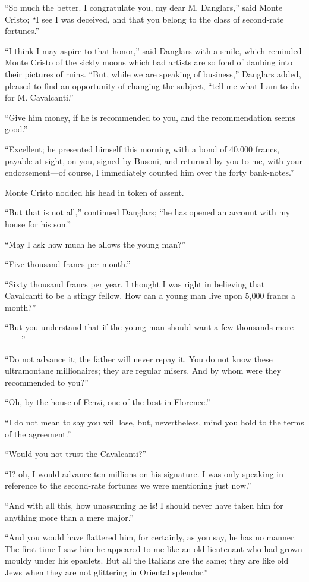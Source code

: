 “So much the better. I congratulate you, my dear M. Danglars,” said
Monte Cristo; “I see I was deceived, and that you belong to the class
of second-rate fortunes.”

“I think I may aspire to that honor,” said Danglars with a smile, which
reminded Monte Cristo of the sickly moons which bad artists are so fond
of daubing into their pictures of ruins. “But, while we are speaking of
business,” Danglars added, pleased to find an opportunity of changing
the subject, “tell me what I am to do for M. Cavalcanti.”

“Give him money, if he is recommended to you, and the recommendation
seems good.”

“Excellent; he presented himself this morning with a bond of 40,000
francs, payable at sight, on you, signed by Busoni, and returned by you
to me, with your endorsement—of course, I immediately counted him over
the forty bank-notes.”

Monte Cristo nodded his head in token of assent.

“But that is not all,” continued Danglars; “he has opened an account
with my house for his son.”

“May I ask how much he allows the young man?”

“Five thousand francs per month.”

“Sixty thousand francs per year. I thought I was right in believing
that Cavalcanti to be a stingy fellow. How can a young man live upon
5,000 francs a month?”

“But you understand that if the young man should want a few thousands
more——”

“Do not advance it; the father will never repay it. You do not know
these ultramontane millionaires; they are regular misers. And by whom
were they recommended to you?”

“Oh, by the house of Fenzi, one of the best in Florence.”

“I do not mean to say you will lose, but, nevertheless, mind you hold
to the terms of the agreement.”

“Would you not trust the Cavalcanti?”

“I? oh, I would advance ten millions on his signature. I was only
speaking in reference to the second-rate fortunes we were mentioning
just now.”

“And with all this, how unassuming he is! I should never have taken him
for anything more than a mere major.”

“And you would have flattered him, for certainly, as you say, he has no
manner. The first time I saw him he appeared to me like an old
lieutenant who had grown mouldy under his epaulets. But all the
Italians are the same; they are like old Jews when they are not
glittering in Oriental splendor.”

